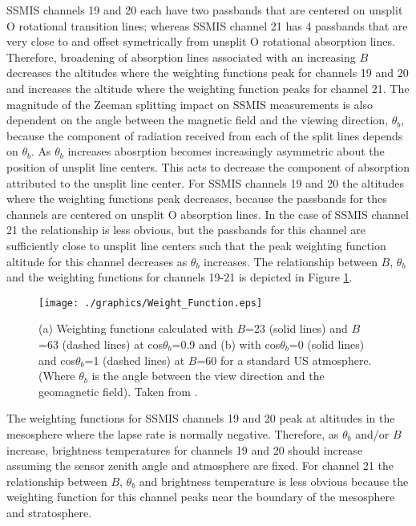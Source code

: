 SSMIS channels 19 and 20 each have two passbands that are centered on unsplit O rotational transition lines; whereas SSMIS channel 21 has 4 passbands that are very close to and offset symetrically from unsplit O rotational absorption lines. Therefore, broadening of absorption lines associated with an increasing $B$ decreases the altitudes where the weighting functions peak for channels 19 and 20 and increases the altitude where the weighting function peaks for channel 21. The magnitude of the Zeeman splitting impact on SSMIS measurements is also dependent on the angle between the magnetic field and the viewing direction, $\theta_{b}$, because the component of radiation received from each of the split lines depends on $\theta_{b}$. As $\theta_{b}$ increases abosrption becomes increasingly asymmetric about the position of unsplit line centers. This acts to decrease the component of absorption attributed to the unsplit line center. For SSMIS channels 19 and 20 the altitudes where the weighting functions peak decreases, because the passbands for thes channels are centered on unsplit O absorption lines. In the case of SSMIS channel 21 the relationship is less obvious, but the passbands for this channel are sufficiently close to unsplit line centers such that the peak weighting function altitude for this channel decreases as $\theta_{b}$ increases. The relationship between $B$, $\theta_{b}$ and the weighting functions for channels 19-21 is depicted in Figure \ref{fig:Weight_Function}.
\begin{figure}[htp]
  \centering{}
  \texttt{[image: ./graphics/Weight\_Function.eps]}
  \caption{(a) Weighting functions calculated with $B$=23\microtesla{} (solid lines) and $B$=63\microtesla{} (dashed lines) at cos$\theta_{b}$=0.9 and (b) with cos$\theta_{b}$=0 (solid lines) and cos$\theta_{b}$=1 (dashed lines) at $B$=60\microtesla{} for a standard US atmosphere.   (Where $\theta_{b}$ is the angle between the view direction and the geomagnetic field). Taken from \cite{Han2007}.}
  \label{fig:Weight_Function}
\end{figure}

The weighting functions for SSMIS channels 19 and 20 peak at altitudes in the mesosphere where the lapse rate is normally negative. Therefore, as $\theta_{b}$ and/or $B$ increase, brightness temperatures for channels 19 and 20 should increase assuming the sensor zenith angle and atmosphere are fixed. For channel 21 the relationship between $B$, $\theta_{b}$ and brightness temperature is less obvious because the weighting function for this channel peaks near the boundary of the mesosphere and stratosphere.
 



